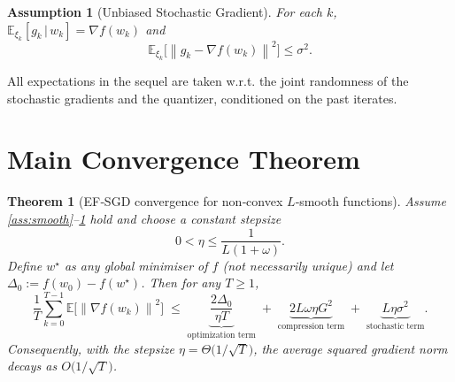 \documentclass{article}
\newtheorem{theorem}{Theorem}
\newtheorem{assumption}{Assumption}
\newcommand{\E}{\mathbb{E}}
\newcommand{\norm}[1]{\left\lVert #1\right\rVert}
\begin{document}
\begin{assumption}[Unbiased Stochastic Gradient]\label{ass:unbiased}
For each $k$, $\E_{\xi_k}[g_k\,|\,w_k]=\nabla f(w_k)$ and
\[
\E_{\xi_k}\!\bigl[\norm{g_k-\nabla f(w_k)}^2\bigr]\le\sigma^2 .
\tag{A4}
\]
\end{assumption}

All expectations in the sequel are taken w.r.t. the joint randomness of the stochastic gradients and the quantizer, conditioned on the past iterates.

\section*{Main Convergence Theorem}
\begin{theorem}[EF‑SGD convergence for non‑convex $L$‑smooth functions]\label{thm:main}
Assume \ref{ass:smooth}–\ref{ass:unbiased} hold and choose a constant stepsize
\[
0<\eta\le \frac{1}{L(1+\omega)} .
\]
Define $w^{\star}$ as any global minimiser of $f$ (not necessarily unique) and let
$\Delta_0:=f(w_0)-f(w^{\star})$. Then for any $T\ge 1$,
\[
\frac{1}{T}\sum_{k=0}^{T-1}\E\!\bigl[\norm{\nabla f(w_k)}^2\bigr]
\;\le\;
\underbrace{\frac{2\Delta_0}{\eta T}}_{\text{optimization term}}
\;+\;
\underbrace{2L\omega\eta G^2}_{\text{compression term}}
\;+\;
\underbrace{L\eta\sigma^2}_{\text{stochastic term}} .
\tag{1}
\]
Consequently, with the stepsize $\eta = \Theta\!\bigl(1/\sqrt{T}\bigr)$,
the average squared gradient norm decays as $O\!\bigl(1/\sqrt{T}\bigr)$.
\end{theorem}
\end{document}
